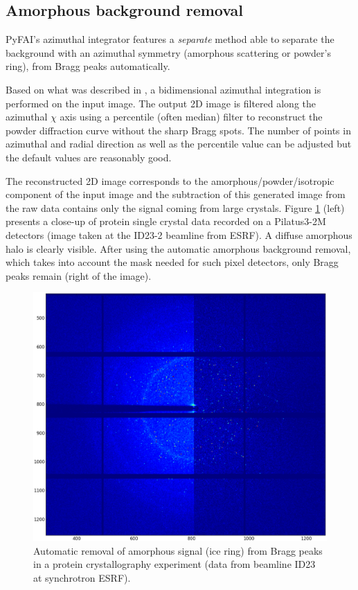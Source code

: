 \documentclass[preprint]{iucr}
\begin{document}
\subsection{Amorphous background removal}

PyFAI's azimuthal integrator features a \textit{separate} method able to separate
the background with an azimuthal symmetry (amorphous scattering or powder's
ring), from Bragg peaks automatically.

Based on what was described in \cite{PyFAI_PDJ}, a bidimensional azimuthal
integration is performed on the input image.
The output 2D image is filtered along the azimuthal $\chi$ axis using a
percentile (often median) filter to reconstruct the powder diffraction curve
without the sharp Bragg spots.
The number of points in azimuthal and radial direction as well as
the percentile value can be adjusted but the default values are reasonably
good.

The reconstructed 2D image corresponds to the amorphous/powder/isotropic
component of the input image and the subtraction of this generated image from
the raw data contains only the signal coming from large crystals.
Figure \ref{separate} (left)
presents a close-up of protein single crystal data recorded on a Pilatus3-2M
detectors (image taken at the ID23-2 beamline from ESRF). A
diffuse amorphous halo is clearly visible.
After using the automatic amorphous background removal, which takes into account
the mask needed for such pixel detectors, only Bragg peaks remain (right of
the image).

\begin{figure}
\label{separate}
\begin{center}
\includegraphics[width=15cm]{separate_id23.eps}
\caption{Automatic removal of amorphous signal (ice ring) from Bragg peaks in a
protein crystallography experiment (data from beamline ID23 at synchrotron
ESRF).}
\end{center}
\end{figure}
\end{document}
